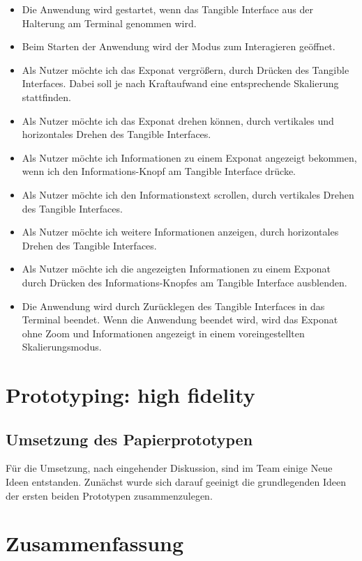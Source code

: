 \documentclass[runningheads,a4paper]{llncs}
\begin{document}
\begin{itemize}
	\item Die Anwendung wird gestartet, wenn das Tangible Interface aus der Halterung am Terminal genommen wird.
	\item Beim Starten der Anwendung wird der Modus zum Interagieren geöffnet.
	\item Als Nutzer möchte ich das Exponat vergrößern, durch  Drücken des Tangible Interfaces. Dabei soll je nach Kraftaufwand eine entsprechende Skalierung stattfinden. 
	\item Als Nutzer möchte ich das Exponat drehen können, durch vertikales und horizontales Drehen des Tangible Interfaces.
	\item Als Nutzer möchte ich Informationen zu einem Exponat angezeigt bekommen, wenn ich den Informations-Knopf am Tangible Interface drücke.
	\item Als Nutzer möchte ich den Informationstext scrollen, durch vertikales Drehen des Tangible Interfaces.
	\item Als Nutzer möchte ich weitere Informationen anzeigen, durch horizontales Drehen des Tangible Interfaces.
	\item Als Nutzer möchte ich die angezeigten Informationen zu einem Exponat durch Drücken des Informations-Knopfes am Tangible Interface ausblenden.
	\item Die Anwendung wird durch Zurücklegen des Tangible Interfaces in das Terminal beendet.
	Wenn die Anwendung beendet wird, wird das Exponat ohne Zoom und Informationen angezeigt in einem voreingestellten Skalierungsmodus.
	
\end{itemize}

\section{Prototyping: high fidelity}
\subsection{Umsetzung des Papierprototypen}

Für die Umsetzung, nach eingehender Diskussion, sind im Team einige Neue Ideen entstanden. Zunächst wurde sich darauf geeinigt die grundlegenden Ideen der ersten beiden Prototypen zusammenzulegen.

\section{Zusammenfassung}


\newpage
 

\end{document}
